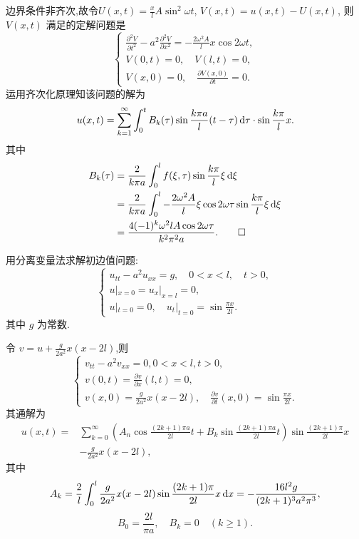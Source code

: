\begin{solve}
  边界条件非齐次,故令$U(x,t)=\frac{x}{l}A\sin^2\omega t$,
  $V(x,t)=u(x,t)-U(x,t)$, 则 $V(x,t)$ 满足的定解问题是
  \[\begin{cases}
    \frac{\partial^2V}{\partial t^2}-a^2\frac{\partial^2V}{\partial x^2}
      = -\frac{2\omega^2A}{l}x\cos 2\omega t, \\
    V(0,t)=0,\quad V(l,t)=0, \\
    V(x,0)=0,\quad \frac{\partial V(x,0)}{\partial t} = 0.
  \end{cases}\]
  运用齐次化原理知该问题的解为
  \[u(x,t)=\sum_{k=1}^{\infty}\int_0^tB_k(\tau)\sin\frac{k\pi a}{l}(t-\tau)\mathop{}\!\mathrm{d}\tau
    \cdot\sin\frac{k\pi}{l}x.\]
  其中
  \[\begin{split}
    B_k(\tau)
    & = \frac{2}{k\pi a}\int_0^lf(\xi,\tau)\sin\frac{k\pi}{l}\xi\mathop{}\!\mathrm{d}\xi \\
    & = \frac{2}{k\pi a}\int_0^l-\frac{2\omega^2A}{l}\xi\cos2\omega\tau
      \sin\frac{k\pi}{l}\xi\mathop{}\!\mathrm{d}\xi \\
    & = \frac{4(-1)^k\omega^2lA\cos2\omega\tau}{k^2\pi^2a}.\qedhere
  \end{split}\]
\end{solve}


\begin{exercise}[4]
  用分离变量法求解初边值问题:
  \[\begin{cases}
    u_{tt} - a^2 u_{xx} = g,\quad 0<x<l,\quad t>0, \\
    u|_{x=0} = u_x|_{x=l} = 0, \\
    u|_{t=0} = 0,\quad u_t|_{t=0} =\sin\frac{\pi x}{2l}.
  \end{cases}\]
  其中 $g$ 为常数.
\end{exercise}

\begin{solve}
  令 $v=u+\frac{g}{2a^2}x(x-2l)$,则
  \[\begin{cases}
    v_{tt}-a^2v_{xx}=0,0<x<l,t>0, \\
    v(0,t)=\frac{\partial v}{\partial x}(l,t)=0, \\
    v(x,0)=\frac{g}{2a^2}x(x-2l),\quad\frac{\partial v}{\partial t}(x,0)=\sin\frac{\pi x}{2l}.
  \end{cases}\]
  其通解为
  \begin{align*}
    u(x,t)
    ={} & \sum_{k=0}^{\infty}\left(A_n\cos\frac{(2k+1)\pi a}{2l}t+B_k\sin\frac{(2k+1)\pi a}{2l}t\right)\sin\frac{(2k+1)\pi}{2l}x \\
    & - \frac{g}{2a^2}x(x-2l),
  \end{align*}
  其中
  \[A_k=\frac{2}{l}\int_0^l\frac{g}{2a^2}x(x-2l)\sin\frac{(2k+1)\pi}{2l}x\mathop{}\!\mathrm{d} x
    = -\frac{16l^2g}{(2k+1)^3a^2\pi^3},\]
  \[B_0=\frac{2l}{\pi a},\quad B_k=0\quad (k\geq 1).\]
\end{solve}


